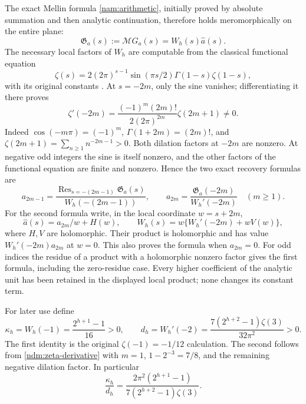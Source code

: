 The exact Mellin formula \eqref{nam:arithmetic}, initially proved by
absolute summation and then analytic continuation, therefore holds
meromorphically on the entire plane:
\begin{equation}\label{ndm:product}
 \mathfrak G_a(s):=\mathcal M G_a(s)=W_h(s)\widehat a(s).
\end{equation}
The necessary local factors of \(W_h\) are computable from the
classical functional equation
\[
 \zeta(s)=2(2\pi)^{s-1}\sin(\pi s/2)\Gamma(1-s)\zeta(1-s),
\]
with its original constants \cite[\S25.4, (25.4.2)]{apostolDLMF25}.
At \(s=-2m\), only the sine vanishes; differentiating it there proves
\begin{equation}\label{ndm:zeta-derivative}
 \zeta'(-2m)=
 \frac{(-1)^m(2m)!}{2(2\pi)^{2m}}\zeta(2m+1)\ne0.
\end{equation}
Indeed \(\cos(-m\pi)=(-1)^m\), \(\Gamma(1+2m)=(2m)!\),
and \(\zeta(2m+1)=\sum_{n\ge1}n^{-2m-1}>0\).
Both dilation factors at \(-2m\) are nonzero. At negative odd
integers the sine is itself nonzero, and the other factors of the
functional equation are finite and nonzero. Hence the two exact
recovery formulas are
\begin{equation}\label{ndm:all-coefficients}
 \boxed{\quad
 a_{2m-1}=
 \frac{\operatorname{Res}_{s=-(2m-1)}\mathfrak G_a(s)}
       {W_h(-(2m-1))},\qquad
 a_{2m}=\frac{\mathfrak G_a(-2m)}{W_h'(-2m)}
       \quad(m\ge1).\quad}
\end{equation}
For the second formula write, in the local coordinate \(w=s+2m\),
\[
 \widehat a(s)=a_{2m}/w+H(w),\qquad
 W_h(s)=w\{W_h'(-2m)+wV(w)\},
\]
where \(H,V\) are holomorphic. Their product is holomorphic and has
value \(W_h'(-2m)a_{2m}\) at \(w=0\).
This also proves the formula when \(a_{2m}=0\).
For odd indices the residue of a product with a holomorphic nonzero
factor gives the first formula, including the zero-residue case.
Every higher coefficient of the analytic unit has been retained in
the displayed local product; none changes its constant term.

For later use define
\begin{equation}\label{ndm:constants}
 \kappa_h=W_h(-1)=\frac{2^{h+1}-1}{16}>0,\qquad
 d_h=W_h'(-2)=
       \frac{7(2^{h+2}-1)\zeta(3)}{32\pi^2}>0.
\end{equation}
The first identity is the original \(\zeta(-1)=-1/12\) calculation.
The second follows from \eqref{ndm:zeta-derivative} with \(m=1\),
\(1-2^{-3}=7/8\), and the remaining negative dilation factor.
In particular
\[
 \frac{\kappa_h}{d_h}
 =\frac{2\pi^2(2^{h+1}-1)}
         {7(2^{h+2}-1)\zeta(3)} .
\]

